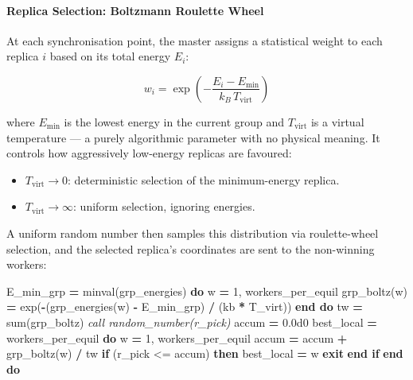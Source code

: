 \documentclass[
]{article}
\newenvironment{Shaded}{}{}
\newcommand{\BuiltInTok}[1]{\textcolor[rgb]{0.00,0.50,0.00}{#1}}
\newcommand{\CommentTok}[1]{\textcolor[rgb]{0.38,0.63,0.69}{\textit{#1}}}
\newcommand{\DecValTok}[1]{\textcolor[rgb]{0.25,0.63,0.44}{#1}}
\newcommand{\FloatTok}[1]{\textcolor[rgb]{0.25,0.63,0.44}{#1}}
\newcommand{\FunctionTok}[1]{\textcolor[rgb]{0.02,0.16,0.49}{#1}}
\newcommand{\KeywordTok}[1]{\textcolor[rgb]{0.00,0.44,0.13}{\textbf{#1}}}
\newcommand{\NormalTok}[1]{#1}
\newcommand{\OperatorTok}[1]{\textcolor[rgb]{0.40,0.40,0.40}{#1}}
\providecommand{\tightlist}{%
  \setlength{\itemsep}{0pt}\setlength{\parskip}{0pt}}
\begin{document}
\paragraph{Replica Selection: Boltzmann Roulette
Wheel}\label{replica-selection-boltzmann-roulette-wheel}

At each synchronisation point, the master assigns a statistical weight
to each replica \(i\) based on its total energy \(E_i\):

\[w_i = \exp\!\left(-\frac{E_i - E_{\min}}{k_B \, T_{\text{virt}}}\right)\]

where \(E_{\min}\) is the lowest energy in the current group and
\(T_{\text{virt}}\) is a virtual temperature --- a purely algorithmic
parameter with no physical meaning. It controls how aggressively
low-energy replicas are favoured:

\begin{itemize}
\tightlist
\item
  \(T_{\text{virt}} \to 0\): deterministic selection of the
  minimum-energy replica.
\item
  \(T_{\text{virt}} \to \infty\): uniform selection, ignoring energies.
\end{itemize}

A uniform random number then samples this distribution via
roulette-wheel selection, and the selected replica's coordinates are
sent to the non-winning workers:

\begin{Shaded}
\begin{Highlighting}[]
\NormalTok{E\_min\_grp }\KeywordTok{=} \FunctionTok{minval}\NormalTok{(grp\_energies)}
\KeywordTok{do}\NormalTok{ w }\KeywordTok{=} \DecValTok{1}\NormalTok{, workers\_per\_equil}
\NormalTok{  grp\_boltz(w) }\KeywordTok{=} \BuiltInTok{exp}\NormalTok{(}\KeywordTok{{-}}\NormalTok{(grp\_energies(w) }\KeywordTok{{-}}\NormalTok{ E\_min\_grp) }\KeywordTok{/}\NormalTok{ (kb }\KeywordTok{*}\NormalTok{ T\_virt))}
\KeywordTok{end do}
\NormalTok{tw }\KeywordTok{=} \FunctionTok{sum}\NormalTok{(grp\_boltz)}
\CommentTok{call random\_number(r\_pick)}
\NormalTok{accum }\KeywordTok{=} \FloatTok{0.0d0}
\NormalTok{best\_local }\KeywordTok{=}\NormalTok{ workers\_per\_equil}
\KeywordTok{do}\NormalTok{ w }\KeywordTok{=} \DecValTok{1}\NormalTok{, workers\_per\_equil}
\NormalTok{  accum }\KeywordTok{=}\NormalTok{ accum }\KeywordTok{+}\NormalTok{ grp\_boltz(w) }\KeywordTok{/}\NormalTok{ tw}
  \KeywordTok{if}\NormalTok{ (r\_pick }\OperatorTok{\textless{}=}\NormalTok{ accum) }\KeywordTok{then}
\NormalTok{    best\_local }\KeywordTok{=}\NormalTok{ w}
    \KeywordTok{exit}
  \KeywordTok{end if}
\KeywordTok{end do}
\end{Highlighting}
\end{Shaded}
\end{document}

